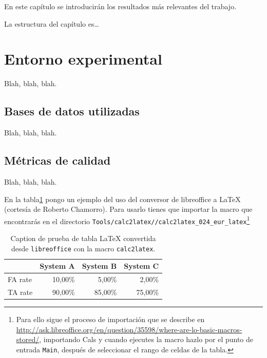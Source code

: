 \documentclass[spanish,openright]{book}
\begin{document}
En este capítulo se introducirán los resultados más relevantes del
trabajo. 

La estructura del capítulo es\ldots


\section{Entorno experimental}
\label{sec:entorno-experimental}

Blah, blah, blah.


\subsection{Bases de datos utilizadas}
\label{sec:bases-de-datos-1}

Blah, blah, blah.


\subsection{Métricas de calidad}
\label{sec:metricas-de-calidad}

Blah, blah, blah.

En la tabla\ref{pruebaCalc2LaTeX} pongo un ejemplo del uso del conversor
de libreoffice a \LaTeX{} (cortesía de Roberto Chamorro). Para usarlo
tienes que importar la macro que encontrarás en el directorio
\texttt{Tools/calc2latex//calc2latex\_024\_eur\_latex}\footnote{Para
  ello sigue el proceso de importación que se describe en
  \url{http://ask.libreoffice.org/en/question/35598/where-are-lo-basic-macros-stored/},
  importando Cals
  y cuando ejecutes la macro hazlo por el punto de entrada
  \texttt{Main}, después de seleccionar el rango de celdas de la tabla.}

\begin{table}[htbp]
\caption{Caption de prueba de tabla LaTeX convertida desde
  \texttt{libreoffice} con la macro \texttt{calc2latex}.}
\begin{center}
\begin{tabular}{|l|r|r|r|}
\hline
 & \multicolumn{1}{l|}{System A} & \multicolumn{1}{l|}{System B} & \multicolumn{1}{l|}{System C} \\ \hline
FA rate & 10,00\% & 5,00\% & 2,00\% \\ \hline
TA rate & 90,00\% & 85,00\% & 75,00\% \\ \hline
\end{tabular}
\end{center}
\label{pruebaCalc2LaTeX}
\end{table}
\end{document}
